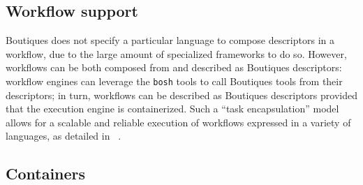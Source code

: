\documentclass[a4paper,num-refs]{oup-contemporary}
\newcommand{\boutiques}{Boutiques\xspace}
\newcommand{\notimplementedyet}[1]{\color{blue}\emph{#1}\footnote{Still needs to be implemented}\color{black}\xspace}
\begin{document}


\subsection{Workflow support}

\boutiques does not specify a particular language to compose
descriptors in a workflow, due to the large amount of specialized
frameworks to do so. However, workflows can be both composed from and
described as \boutiques descriptors: workflow engines can leverage the
\texttt{bosh} tools to call \boutiques tools from their descriptors;
in turn, workflows can be described as \boutiques descriptors provided
that the execution engine is containerized. Such a ``task
encapsulation'' model allows for a scalable and reliable execution of
workflows expressed in a variety of languages, as detailed in
~\cite{GLATARD2017239}.

\subsection{Containers}
\end{document}
